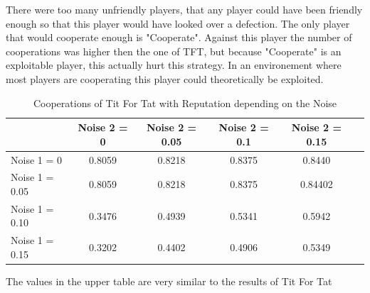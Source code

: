 \documentclass[11pt,twoside]{article}
\begin{document}
There were too many unfriendly players, that any player could have been friendly enough so that this player would have looked over a defection. The only player that would cooperate enough is "Cooperate". Against this player the number of cooperations was higher then the one of TFT, but because "Cooperate" is an exploitable player, this actually hurt this strategy.
In an environement where most players are cooperating this player could theoretically be exploited.

\begin{table}[h]
 \begin{center}
\caption{Cooperations of Tit For Tat with Reputation depending on the Noise} \vspace{3mm}
\begin{tabular}{|l|c|c|c|c|c|}
\hline
   	& Noise 2 = 0 & Noise 2 = 0.05& Noise 2 = 0.1& Noise 2 = 0.15 \\
  \hline
  Noise 1 = 0 	&           0.8059  & 0.8218&    0.8375   & 0.8440 \\
 \hline
  Noise 1 = 0.05	 &     0.8059  &  0.8218 &   0.8375   & 0.84402 \\
 \hline
  Noise 1 = 0.10 	&     0.3476  &  0.4939  &  0.5341  &  0.5942 \\
 \hline
  Noise 1 = 0.15 	&    0.3202 &   0.4402 &   0.4906 &   0.5349 \\
 \hline
\end{tabular}
 \end{center}
\end{table}

The values in the upper table are very similar to the results of Tit For Tat

\newpage
\end{document}
